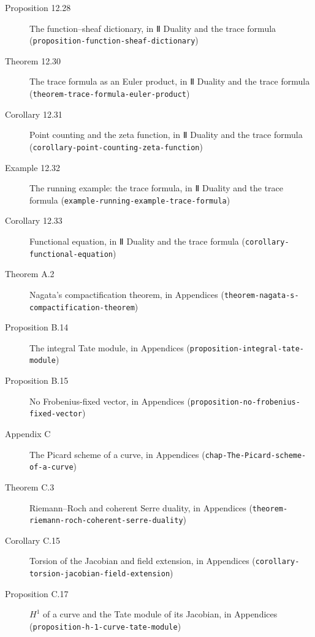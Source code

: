 \documentclass[11pt]{article}
\newcommand{\bpslug}[1]{\texttt{#1}}
\begin{document}
\begin{description}
\item[Proposition 12.28] The function–sheaf dictionary, in Ⅱ Duality and the trace formula (\bpslug{proposition-{}\allowbreak{}function-{}\allowbreak{}sheaf-{}\allowbreak{}dictionary})
\item[Theorem 12.30] The trace formula as an Euler product, in Ⅱ Duality and the trace formula (\bpslug{theorem-{}\allowbreak{}trace-{}\allowbreak{}formula-{}\allowbreak{}euler-{}\allowbreak{}product})
\item[Corollary 12.31] Point counting and the zeta function, in Ⅱ Duality and the trace formula (\bpslug{corollary-{}\allowbreak{}point-{}\allowbreak{}counting-{}\allowbreak{}zeta-{}\allowbreak{}function})
\item[Example 12.32] The running example: the trace formula, in Ⅱ Duality and the trace formula (\bpslug{example-{}\allowbreak{}running-{}\allowbreak{}example-{}\allowbreak{}trace-{}\allowbreak{}formula})
\item[Corollary 12.33] Functional equation, in Ⅱ Duality and the trace formula (\bpslug{corollary-{}\allowbreak{}functional-{}\allowbreak{}equation})
\item[Theorem A.2] Nagata's compactification theorem, in Appendices (\bpslug{theorem-{}\allowbreak{}nagata-{}\allowbreak{}s-{}\allowbreak{}compactification-{}\allowbreak{}theorem})
\item[Proposition B.14] The integral Tate module, in Appendices (\bpslug{proposition-{}\allowbreak{}integral-{}\allowbreak{}tate-{}\allowbreak{}module})
\item[Proposition B.15] No Frobenius-fixed vector, in Appendices (\bpslug{proposition-{}\allowbreak{}no-{}\allowbreak{}frobenius-{}\allowbreak{}fixed-{}\allowbreak{}vector})
\item[Appendix C] The Picard scheme of a curve, in Appendices (\bpslug{chap-{}\allowbreak{}The-{}\allowbreak{}Picard-{}\allowbreak{}scheme-{}\allowbreak{}of-{}\allowbreak{}a-{}\allowbreak{}curve})
\item[Theorem C.3] Riemann–Roch and coherent Serre duality, in Appendices (\bpslug{theorem-{}\allowbreak{}riemann-{}\allowbreak{}roch-{}\allowbreak{}coherent-{}\allowbreak{}serre-{}\allowbreak{}duality})
\item[Corollary C.15] Torsion of the Jacobian and field extension, in Appendices (\bpslug{corollary-{}\allowbreak{}torsion-{}\allowbreak{}jacobian-{}\allowbreak{}field-{}\allowbreak{}extension})
\item[Proposition C.17] $H^1$ of a curve and the Tate module of its Jacobian, in Appendices (\bpslug{proposition-{}\allowbreak{}h-{}\allowbreak{}1-{}\allowbreak{}curve-{}\allowbreak{}tate-{}\allowbreak{}module})

\end{description}
\end{document}

